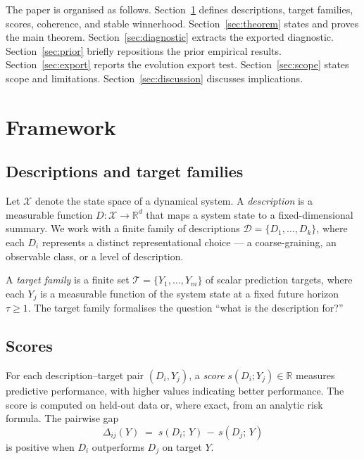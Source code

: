 \documentclass[11pt]{article}
\begin{document}
The paper is organised as follows.
Section~\ref{sec:framework} defines descriptions, target families, scores,
coherence, and stable winnerhood.
Section~\ref{sec:theorem} states and proves the main theorem.
Section~\ref{sec:diagnostic} extracts the exported diagnostic.
Section~\ref{sec:prior} briefly repositions the prior empirical results.
Section~\ref{sec:export} reports the evolution export test.
Section~\ref{sec:scope} states scope and limitations.
Section~\ref{sec:discussion} discusses implications.


\section{Framework}
\label{sec:framework}

\subsection{Descriptions and target families}

Let $\mathcal{X}$ denote the state space of a dynamical system.
A \emph{description} is a measurable function $D : \mathcal{X} \to \mathbb{R}^d$
that maps a system state to a fixed-dimensional summary.
We work with a finite family of descriptions
$\mathcal{D} = \{D_1, \dots, D_k\}$,
where each $D_i$ represents a distinct representational choice ---
a coarse-graining, an observable class, or a level of description.

A \emph{target family} is a finite set
$\mathcal{T} = \{Y_1, \dots, Y_m\}$
of scalar prediction targets,
where each $Y_j$ is a measurable function of the system state at a fixed
future horizon $\tau \geq 1$.
The target family formalises the question ``what is the description for?''

\subsection{Scores}

For each description--target pair $(D_i, Y_j)$,
a \emph{score} $s(D_i; Y_j) \in \mathbb{R}$ measures predictive performance,
with higher values indicating better performance.
The score is computed on held-out data or, where exact, from an analytic
risk formula.
The pairwise gap
\begin{equation}
    \Delta_{ij}(Y) \;=\; s(D_i;\, Y) \,-\, s(D_j;\, Y)
\end{equation}
is positive when $D_i$ outperforms $D_j$ on target $Y$.
\end{document}
